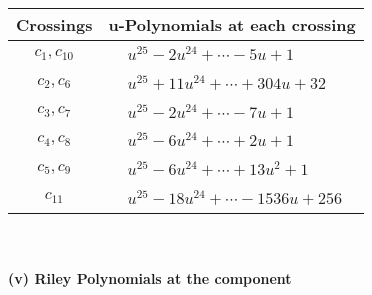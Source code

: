\documentclass[1p]{elsarticle_modified}
\theoremstyle{definition}
\begin{document}
\begin{tabular}{m{50pt}|m{274pt}}
Crossings & \hspace{64pt}u-Polynomials at each crossing \\
\hline $$\begin{aligned}c_{1},c_{10}\end{aligned}$$&$\begin{aligned}
&u^{25}-2 u^{24}+\cdots-5 u+1
\end{aligned}$\\
\hline $$\begin{aligned}c_{2},c_{6}\end{aligned}$$&$\begin{aligned}
&u^{25}+11 u^{24}+\cdots+304 u+32
\end{aligned}$\\
\hline $$\begin{aligned}c_{3},c_{7}\end{aligned}$$&$\begin{aligned}
&u^{25}-2 u^{24}+\cdots-7 u+1
\end{aligned}$\\
\hline $$\begin{aligned}c_{4},c_{8}\end{aligned}$$&$\begin{aligned}
&u^{25}-6 u^{24}+\cdots+2 u+1
\end{aligned}$\\
\hline $$\begin{aligned}c_{5},c_{9}\end{aligned}$$&$\begin{aligned}
&u^{25}-6 u^{24}+\cdots+13 u^2+1
\end{aligned}$\\
\hline $$\begin{aligned}c_{11}\end{aligned}$$&$\begin{aligned}
&u^{25}-18 u^{24}+\cdots-1536 u+256
\end{aligned}$\\
\hline
\end{tabular}\\~\\
\newpage\renewcommand{\arraystretch}{1}
\flushleft \textbf{(v) Riley Polynomials at the component}\newline \\
\end{document}
